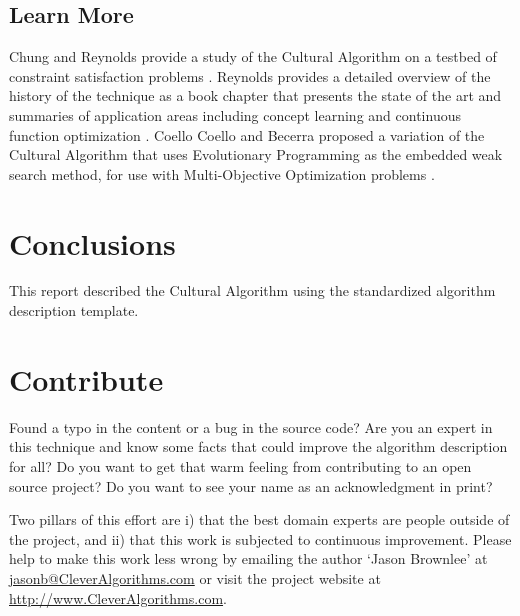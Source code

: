 \documentclass[a4paper, 11pt]{article}
\makeatletter
\newcommand{\myreportauthor}{Jason Brownlee}
\newcommand{\myreportemail}{jasonb@CleverAlgorithms.com}
\newcommand{\myreportwebsite}{http://www.CleverAlgorithms.com}
\makeatother
\begin{document}
\subsection{Learn More}
Chung and Reynolds provide a study of the Cultural Algorithm on a testbed of constraint satisfaction problems \cite{Chung1996}.
Reynolds provides a detailed overview of the history of the technique as a book chapter that presents the state of the art and summaries of application areas including concept learning and continuous function optimization \cite{Reynolds1999}.
Coello Coello and Becerra proposed a variation of the Cultural Algorithm that uses Evolutionary Programming as the embedded weak search method, for use with Multi-Objective Optimization problems \cite{CoelloCoello2003}.


% 
% 
\section{Conclusions}
\label{sec:conclusions}
This report described the Cultural Algorithm using the standardized algorithm description template.

% 
% 
\section{Contribute}
\label{sec:contribute}
Found a typo in the content or a bug in the source code? 
Are you an expert in this technique and know some facts that could improve the algorithm description for all?
Do you want to get that warm feeling from contributing to an open source project? 
Do you want to see your name as an acknowledgment in print?

Two pillars of this effort are i) that the best domain experts are people outside of the project, and ii) that this work is subjected to continuous improvement. 
Please help to make this work less wrong by emailing the author `\myreportauthor' at \url{\myreportemail} or visit the project website at \url{\myreportwebsite}.



\end{document}
